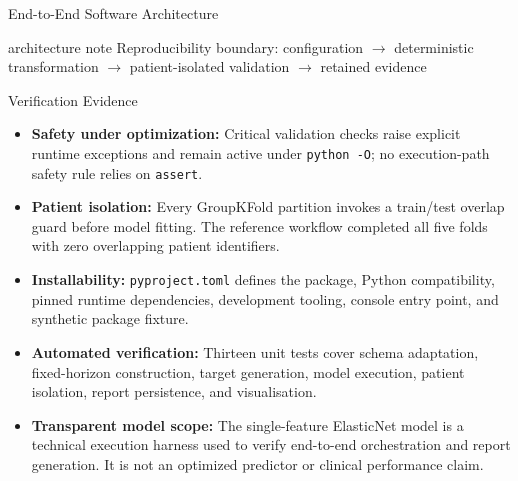 \begin{frame}[t]
\begin{columns}[t]
\begin{column}{\colwidth}
\begin{block}{End-to-End Software Architecture}
\begin{center}
\end{center}

\vspace{0.45cm}

\begin{beamercolorbox}[
  wd=\linewidth,
  rounded=true,
  shadow=false,
  sep=1.3ex,
  center
]{architecture note}
  Reproducibility boundary:
  configuration $\rightarrow$ deterministic transformation $\rightarrow$
  patient-isolated validation $\rightarrow$ retained evidence
\end{beamercolorbox}
\end{block}

\vspace{1cm}

\begin{block}{Verification Evidence}
\begin{itemize}
  \setlength{\itemsep}{0.42em}
  \item \textbf{Safety under optimization:} Critical validation checks raise explicit runtime exceptions and remain active under \texttt{python -O}; no execution-path safety rule relies on \texttt{assert}.
  \item \textbf{Patient isolation:} Every GroupKFold partition invokes a train/test overlap guard before model fitting. The reference workflow completed all five folds with zero overlapping patient identifiers.
  \item \textbf{Installability:} \texttt{pyproject.toml} defines the package, Python compatibility, pinned runtime dependencies, development tooling, console entry point, and synthetic package fixture.
  \item \textbf{Automated verification:} Thirteen unit tests cover schema adaptation, fixed-horizon construction, target generation, model execution, patient isolation, report persistence, and visualisation.
  \item \textbf{Transparent model scope:} The single-feature ElasticNet model is a technical execution harness used to verify end-to-end orchestration and report generation. It is not an optimized predictor or clinical performance claim.
\end{itemize}

\vspace{0.35cm}


\end{block}
\end{column}
\end{columns}
\end{frame}
